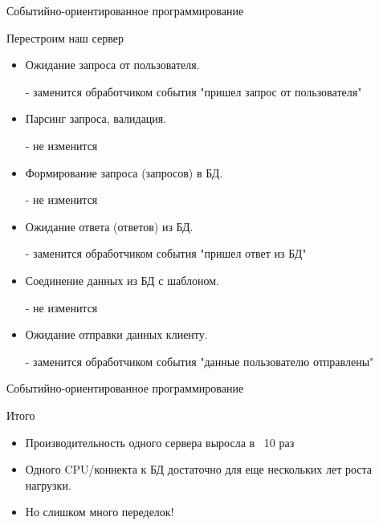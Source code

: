 \documentclass[aspectratio=169]{beamer}
\begin{document}
\begin{frame}{Событийно-ориентированное программирование}
    \begin{block}{Перестроим наш сервер}
        \begin{itemize}
            \pause\item Ожидание запроса от пользователя.
                \pause\par - заменится обработчиком события
                    "пришел запрос от пользователя"

            \pause\item Парсинг запроса, валидация.
                \pause\par - не изменится

            \pause\item Формирование запроса (запросов) в БД.
                \pause\par - не изменится

            \pause\item Ожидание ответа (ответов) из БД.
                \pause\par - заменится обработчиком события
                        "пришел ответ из БД"

            \pause\item Соединение данных из БД с шаблоном.
                \pause\par - не изменится

            \pause\item Ожидание отправки данных клиенту.
                \pause\par - заменится обработчиком события
                        "данные пользователю отправлены"
        \end{itemize}
    \end{block}
\end{frame}


\begin{frame}{Событийно-ориентированное программирование}
    \begin{block}{Итого}
        \begin{itemize}
            \pause\item Производительность одного сервера выросла в ~10 раз
            \pause\item Одного CPU/коннекта к БД достаточно для еще нескольких
                лет роста нагрузки.

            \pause\item Но слишком много переделок!
        \end{itemize}
    \end{block}
\end{frame}
\end{document}
